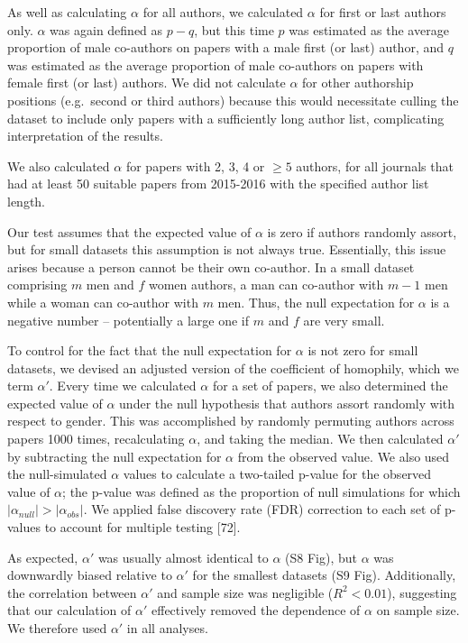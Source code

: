 \documentclass[12pt,]{article}
\begin{document}
As well as calculating \(\alpha\) for all authors, we calculated
\(\alpha\) for first or last authors only. \(\alpha\) was again defined
as \(p - q\), but this time \(p\) was estimated as the average
proportion of male co-authors on papers with a male first (or last)
author, and \(q\) was estimated as the average proportion of male
co-authors on papers with female first (or last) authors. We did not
calculate \(\alpha\) for other authorship positions (e.g.~second or
third authors) because this would necessitate culling the dataset to
include only papers with a sufficiently long author list, complicating
interpretation of the results.

We also calculated \(\alpha\) for papers with 2, 3, 4 or \({\ge}5\)
authors, for all journals that had at least 50 suitable papers from
2015-2016 with the specified author list length.

Our test assumes that the expected value of \(\alpha\) is zero if
authors randomly assort, but for small datasets this assumption is not
always true. Essentially, this issue arises because a person cannot be
their own co-author. In a small dataset comprising \(m\) men and \(f\)
women authors, a man can co-author with \(m - 1\) men while a woman can
co-author with \(m\) men. Thus, the null expectation for \(\alpha\) is a
negative number -- potentially a large one if \(m\) and \(f\) are very
small.

To control for the fact that the null expectation for \(\alpha\) is not
zero for small datasets, we devised an adjusted version of the
coefficient of homophily, which we term \(\alpha'\). Every time we
calculated \(\alpha\) for a set of papers, we also determined the
expected value of \(\alpha\) under the null hypothesis that authors
assort randomly with respect to gender. This was accomplished by
randomly permuting authors across papers 1000 times, recalculating
\(\alpha\), and taking the median. We then calculated \(\alpha'\) by
subtracting the null expectation for \(\alpha\) from the observed value.
We also used the null-simulated \(\alpha\) values to calculate a
two-tailed p-value for the observed value of \(\alpha\); the p-value was
defined as the proportion of null simulations for which
\(|\alpha_{null}| > |\alpha_{obs}|\). We applied false discovery rate
(FDR) correction to each set of p-values to account for multiple testing
{[}72{]}.

As expected, \(\alpha'\) was usually almost identical to \(\alpha\) (S8
Fig), but \(\alpha\) was downwardly biased relative to \(\alpha'\) for
the smallest datasets (S9 Fig). Additionally, the correlation between
\(\alpha'\) and sample size was negligible (\(R^2 < 0.01\)), suggesting
that our calculation of \(\alpha'\) effectively removed the dependence
of \(\alpha\) on sample size. We therefore used \(\alpha'\) in all
analyses.
\end{document}
